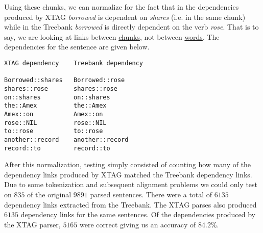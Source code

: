 Using these chunks, we can normalize for the fact that in the
dependencies produced by XTAG {\em borrowed} is dependent on {\em
shares} (i.e. in the same chunk) while in the Treebank {\em borrowed}
is directly dependent on the verb {\em rose}. That is to say, we are
looking at links between \underline{chunks}, not between
\underline{words}. The dependencies for the sentence are given below.

\begin{verbatim}
XTAG dependency    Treebank dependency

Borrowed::shares   Borrowed::rose 
shares::rose       shares::rose 
on::shares         on::shares 
the::Amex          the::Amex 
Amex::on           Amex::on 
rose::NIL          rose::NIL
to::rose           to::rose 
another::record    another::record 
record::to         record::to 
\end{verbatim}

After this normalization, testing simply consisted of counting how
many of the dependency links produced by XTAG matched the Treebank
dependency links. Due to some tokenization and subsequent alignment
problems we could only test on $835$ of the original $9891$ parsed
sentences. There were a total of $6135$ dependency links extracted
from the Treebank. The XTAG parses also produced $6135$ dependency
links for the same sentences. Of the dependencies produced by the XTAG
parser, $5165$ were correct giving us an accuracy of $84.2\%$.




